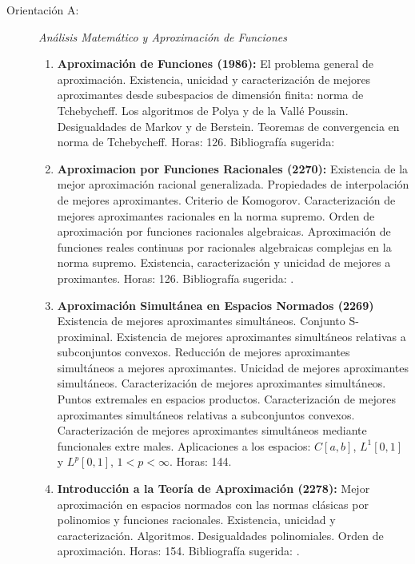 \documentclass[a4paper, 12pt]{article}
\begin{document}
\begin{description}

\item[Orientación A:] \emph{Análisis Matemático y Aproximación de Funciones}
\begin{enumerate}

 

\item\textbf{Aproximación de Funciones (1986):} El problema general de
aproximación. Existencia, unicidad y caracterización de mejores
aproximantes desde subespacios de dimensión finita: norma de
Tchebycheff. Los algoritmos de Polya y de la Vallé Poussin.
Desigualdades de Markov y de Berstein. Teoremas de convergencia en
norma de Tchebycheff. Horas: 126.
 Bibliografía sugerida:
\cite{rice1964approximation,lorentz2005approximation,meinardus2012approximation}

\item\textbf{ Aproximacion por Funciones Racionales (2270):}  Existencia de la mejor aproximación racional  generalizada.  Propiedades  de  interpolación  de  mejores
aproximantes.   Criterio de Komogorov.  Caracterización de mejores aproximantes racionales en la norma supremo.   Orden de aproximación por funciones racionales algebraicas.
Aproximación de funciones reales continuas por racionales algebraicas complejas en la norma
supremo. Existencia, caracterización y unicidad de mejores a
proximantes. Horas: 126.
Bibliografía sugerida: \cite{rice1964approximation,lorentz2005approximation,meinardus2012approximation}.

\item\textbf{ Aproximación Simultánea en Espacios Normados (2269)  } Existencia de mejores aproximantes simultáneos.  Conjunto   S-proximinal.   Existencia   de
mejores   aproximantes simultáneos    relativas    a    subconjuntos    convexos.    Reducción    de    mejores aproximantes simultáneos a mejores aproximantes.
 Unicidad de mejores aproximantes simultáneos.  Caracterización    de    mejores    aproximantes    simultáneos.  Puntos  extremales  en  espacios  productos.
Caracterización  de  mejores  aproximantes  simultáneos   relativas  a  subconjuntos
convexos.  Caracterización  de  mejores aproximantes  simultáneos  mediante  funcionales  extre
males.  Aplicaciones  a  los espacios: $C[a,b]$, $L^1[0,1]$ y $L^p[0,1]$, $1 < p <\infty$.
Horas: 144.
\item\textbf{  Introducción a la Teoría de Aproximación (2278):}
Mejor aproximación en espacios normados con las normas clásicas por polinomios y funciones racionales. Existencia, unicidad y caracterización. Algoritmos. Desigualdades polinomiales. Orden de aproximación. Horas: 154. Bibliografía sugerida: \cite{lorentz2005approximation,rice1964approximation}.


\end{enumerate}
\end{description}
\end{document}
